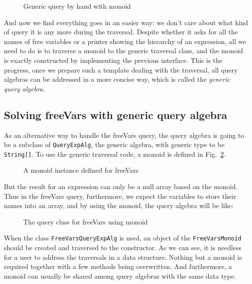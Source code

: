 \begin{figure}[tb]
\vspace{-.1in}
\caption{Generic query by hand with monoid}
\label{generic_query}
\end{figure}

And now we find everything goes in an easier way: we don't care about what kind of query it is any more during the traversal. Despite whether it asks for all the names of free variables or a printer showing the hierarchy of an expression, all we need to do is to traverse a monoid to the generic traversal class, and the monoid is exactly constructed by implementing the previous interface. This is the progress, once we prepare such a template dealing with the traversal, all query algebras can be addressed in a more concise way, which is called the \textit{generic query algebra}.

\subsection{Solving freeVars with generic query algebra}\label{subsec:solvingfreevars}

As an alternative way to handle the freeVars query, the query algebra is going to be a subclass of \lstinline{QueryExpAlg}, the generic algebra, with generic type to be \lstinline{String[]}. To use the generic traversal code, a monoid is defined in Fig.~\ref{freevars_monoid}.

\begin{figure}[tb]
\vspace{-.1in}
\caption{A monoid instance defined for freeVars}
\label{freevars_monoid}
\end{figure}

But the result for an expression can only be a null array based on the monoid. Thus in the freeVars query, furthermore, we expect the variables to store their names into an array, and by using the monoid, the query algebra will be like:

\begin{figure}[!htbp]
\vspace{-.1in}
\caption{The query class for freeVars using monoid}
\label{freevars_query}
\end{figure}

When the class \lstinline{FreeVarsQueryExpAlg} is used, an object of the \lstinline{FreeVarsMonoid} should be created and traversed to the constructor. As we can see, it is needless for a user to address the traversals in a data structure. Nothing but a monoid is required together with a few methods being overwritten. And furthermore, a monoid can usually be shared among query algebras with the same data type.
